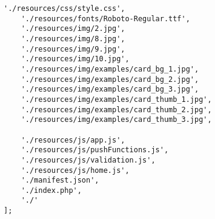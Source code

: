 \begin{lstlisting}[caption={Service Worker Konfiguration - Ressourcen für Caching},label={lst_a3_sw-caching}, frame=single]
    './resources/css/style.css',
    './resources/fonts/Roboto-Regular.ttf',
    './resources/img/2.jpg',
    './resources/img/8.jpg',
    './resources/img/9.jpg',
    './resources/img/10.jpg',
    './resources/img/examples/card_bg_1.jpg',
    './resources/img/examples/card_bg_2.jpg',
    './resources/img/examples/card_bg_3.jpg',
    './resources/img/examples/card_thumb_1.jpg',
    './resources/img/examples/card_thumb_2.jpg',
    './resources/img/examples/card_thumb_3.jpg',

    './resources/js/app.js',
    './resources/js/pushFunctions.js',
    './resources/js/validation.js',
    './resources/js/home.js',
    './manifest.json',
    './index.php',
    './'
];
\end{lstlisting}
